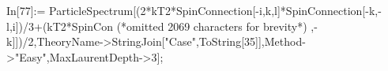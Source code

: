 In[77]:= ParticleSpectrum[(2*kT2*SpinConnection[-i,k,l]*SpinConnection[-k,-l,i])/3+(kT2*SpinCon (*omitted 2069 characters for brevity*) ,-k]])/2,TheoryName->StringJoin["Case",ToString[35]],Method->"Easy",MaxLaurentDepth->3];